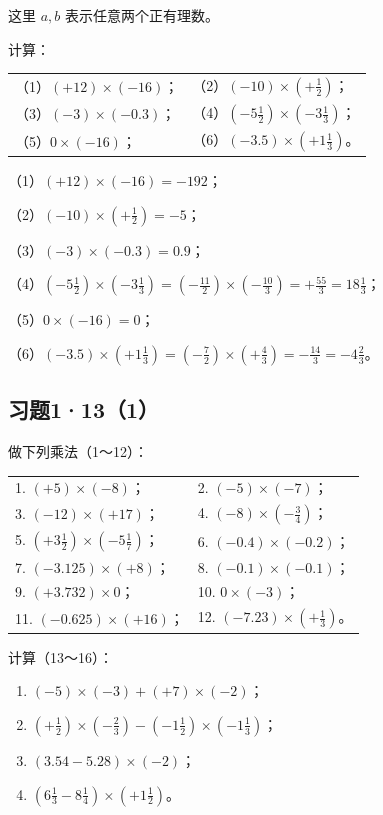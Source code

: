 这里 $a, b$ 表示任意两个正有理数。

 计算：
\par\smallskip
\begin{tabular}{@{}ll@{}}
（1）\((+12) \times (-16)\)； & （2）\((-10) \times \left(+\frac{1}{2}\right)\)； \\[4pt]
（3）\((-3) \times (-0.3)\)； & （4）\(\left(-5\frac{1}{2}\right) \times \left(-3\frac{1}{3}\right)\)； \\[4pt]
（5）\(0 \times (-16)\)； & （6）\((-3.5) \times \left(+1\frac{1}{3}\right)\)。
\end{tabular}

 （1）\((+12) \times (-16) = -192\)；

（2）\((-10) \times \left(+\frac{1}{2}\right) = -5\)；

（3）\((-3) \times (-0.3) = 0.9\)；

（4）\(\left(-5\frac{1}{2}\right) \times \left(-3\frac{1}{3}\right) = \left(-\frac{11}{2}\right) \times \left(-\frac{10}{3}\right) = +\frac{55}{3} = 18\frac{1}{3}\)；

（5）\(0 \times (-16) = 0\)；

（6）\((-3.5) \times \left(+1\frac{1}{3}\right) = \left(-\frac{7}{2}\right) \times \left(+\frac{4}{3}\right) = -\frac{14}{3} = -4\frac{2}{3}\)。

\subsection{习题1·13（1）}

做下列乘法（1～12）：
\par\smallskip
\begin{tabular}{@{}ll@{}}
1. \((+5) \times (-8)\)； & 2. \((-5) \times (-7)\)； \\[4pt]
3. \((-12) \times (+17)\)； & 4. \((-8) \times \left(-\frac{3}{4}\right)\)； \\[4pt]
5. \(\left(+3\frac{1}{2}\right) \times \left(-5\frac{1}{7}\right)\)； & 6. \((-0.4) \times (-0.2)\)； \\[4pt]
7. \((-3.125) \times (+8)\)； & 8. \((-0.1) \times (-0.1)\)； \\[4pt]
9. \((+3.732) \times 0\)； & 10. \(0 \times (-3)\)； \\[4pt]
11. \((-0.625) \times (+16)\)； & 12. \((-7.23) \times \left(+\frac{1}{3}\right)\)。
\end{tabular}
\par\medskip
计算（13～16）：
\begin{enumerate}[start=13]
\item \((-5) \times (-3) + (+7) \times (-2)\)；
\item \(\left(+\frac{1}{2}\right) \times \left(-\frac{2}{3}\right) - \left(-1\frac{1}{2}\right) \times \left(-1\frac{1}{3}\right)\)；
\item \((3.54 - 5.28) \times (-2)\)；
\item \(\left(6\frac{1}{3} - 8\frac{1}{4}\right) \times \left(+1\frac{1}{2}\right)\)。
\end{enumerate}

